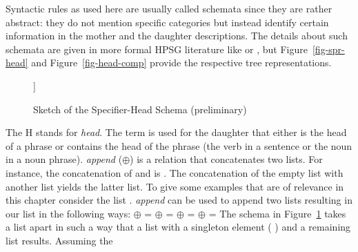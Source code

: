 \noindent
Syntactic rules as used here are usually called schemata since they are rather abstract: they do not
mention specific categories but instead identify certain information in the mother and the daughter descriptions.
The details about such schemata are given in more formal HPSG literature like
 or , 
but Figure~\vref{fig-spr-head} and
Figure~\vref{fig-head-comp} provide the respective tree representations.
\begin{figure}
\begin{forest}
[H\feattab{\spr \ibox{1}}%
  [\ibox{2}]
  [H\feattab{\spr \ibox{1} $\oplus$ \sliste{ \ibox{2} },\\
             \comps \eliste}
  ]]
\end{forest}
\caption{\label{fig-spr-head}Sketch of the Specifier-Head Schema (preliminary)}
\end{figure}
The H stands for \emph{head}. The term  is used for the daughter that either is
the head of a phrase or contains the head of the phrase (\eg the verb in a sentence or the noun in a
noun phrase). \emph{append} ($\oplus$) is a relation that concatenates two 
lists. For instance, the concatenation of  and  is
. The concatenation of the empty list \eliste{} with another list yields
the latter list. To give some examples that are of relevance in this chapter consider the list
. \emph{append} can be used to append two
lists resulting in our list in the following ways:
\eal
\ex \eliste{} $\oplus$  = 
\ex {} $\oplus$  = 
\ex {} $\oplus$  = 
\ex {} $\oplus$ \eliste{} = 
\zl
The schema in Figure~\ref{fig-spr-head} takes a list apart in such a way that a list with a
singleton element (  ) and a remaining list  results. Assuming the
